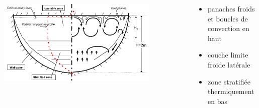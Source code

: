 \begin{frame}[fragile]
\begin{itemize}
\begin{columns}[T]
    \begin{column}{0.6\textwidth}
\centering \includegraphics[width=0.8\textwidth]{Figures/Fig2_Bonnet2001.png}
    \end{column}
    \begin{column}{0.5\textwidth}
    \hskip -1cm \begin{minipage}{\textwidth}
    \begin{itemize}
    \item panaches froids et boucles de convection en haut
    \item couche limite froide latérale
    \item zone stratifiée thermiquement en bas
    \end{itemize}
    \end{minipage}
    \end{column}
\end{columns}
\end{itemize}
\end{frame}
